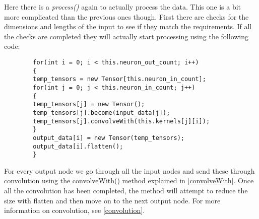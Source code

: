 \documentclass[12pt, titlepage]{article}
\begin{document}
		Here there is a \textit{process()} again to actually process the data. This one is a bit more complicated than the previous ones though. First there are checks for the dimensions and lengths of the input to see if they match the requirements. If all the checks are completed they will actually start processing using the following code:
		\begin{lstlisting}
		for(int i = 0; i < this.neuron_out_count; i++)
		{
		temp_tensors = new Tensor[this.neuron_in_count];
		for(int j = 0; j < this.neuron_in_count; j++)
		{				
		temp_tensors[j] = new Tensor();
		temp_tensors[j].become(input_data[j]);
		temp_tensors[j].convolveWith(this.kernels[j][i]);
		}
		output_data[i] = new Tensor(temp_tensors);
		output_data[i].flatten();
		}
		\end{lstlisting}
		For every output node we go through all the input nodes and send these through convolution using the convolveWith() method explained in \ref{convolveWith}. Once all the convolution has been completed, the method will attempt to reduce the size with flatten and then move on to the next output node. For more information on convolution, see \ref{convolution}.
		
		
		
\end{document}
